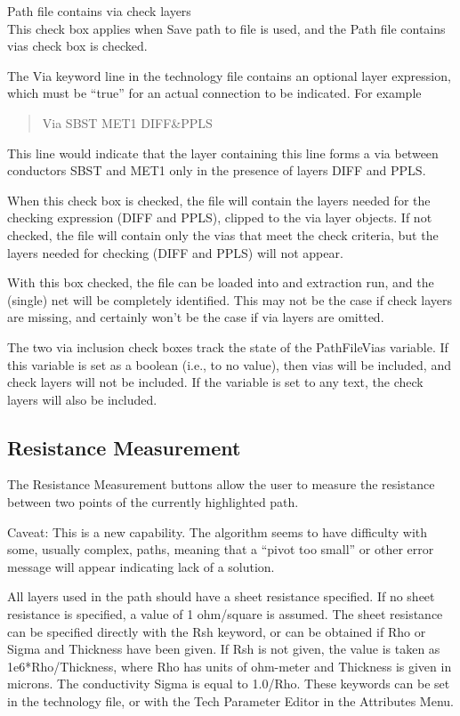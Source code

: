 \begin{description}
\item{\cb Path file contains via check layers}\\
This check box applies when {\cb Save path to file} is used, and
the {\cb Path file contains vias} check box is checked.

The {\et Via} keyword line in the technology file contains an optional
layer expression, which must be ``true'' for an actual connection to
be indicated.  For example

\begin{quote}
{\vt Via SBST MET1 DIFF\&PPLS}
\end{quote}

This line would indicate that the layer containing this line forms a
via between conductors SBST and MET1 only in the presence of layers
DIFF and PPLS.

When this check box is checked, the file will contain the layers
needed for the checking expression (DIFF and PPLS), clipped to the via
layer objects.  If not checked, the file will contain only the vias
that meet the check criteria, but the layers needed for checking (DIFF
and PPLS) will not appear.

With this box checked, the file can be loaded into {\Xic} and
extraction run, and the (single) net will be completely identified. 
This may not be the case if check layers are missing, and certainly
won't be the case if via layers are omitted.
\end{description}

The two via inclusion check boxes track the state of the {\et
PathFileVias} variable.  If this variable is set as a boolean (i.e.,
to no value), then vias will be included, and check layers will not be
included.  If the variable is set to any text, the check layers will
also be included.

\subsection{Resistance Measurement}

The {\cb Resistance Measurement} buttons allow the user to measure the
resistance between two points of the currently highlighted path.

Caveat:  This is a new capability.  The algorithm seems to have
difficulty with some, usually complex, paths, meaning that a ``pivot
too small'' or other error message will appear indicating lack of a
solution.

All layers used in the path should have a sheet resistance specified. 
If no sheet resistance is specified, a value of 1 ohm/square is
assumed.  The sheet resistance can be specified directly with the {\et
Rsh} keyword, or can be obtained if {\et Rho} or {\et Sigma} and {\et
Thickness} have been given.  If {\et Rsh} is not given, the value is
taken as {\vt 1e6*}{\et Rho}/{\et Thickness}, where {\et Rho} has
units of ohm-meter and {\et Thickness} is given in microns.  The
conductivity {\et Sigma} is equal to 1.0/{\et Rho}.  These keywords
can be set in the technology file, or with the {\cb Tech Parameter
Editor} in the {\cb Attributes Menu}.

